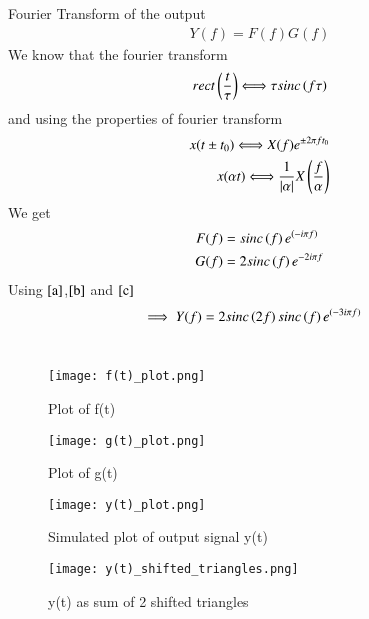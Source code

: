 \documentclass[journal,12pt,twocolumn]{IEEEtran}
\begin{document}
Fourier Transform of the output
\begin{align}
    Y(f)=F(f)G(f)  \label{a}
\end{align}
We know that the fourier transform
\begin{align}
    rect\left(\frac{t}{\tau}\right)\Longleftrightarrow \tau sinc\left({f \tau}\right)
\end{align}
and using the properties of fourier transform
\begin{align}
    x(t\pm t_0)\Longleftrightarrow X(f)e^{\pm 2\pi f t_0}\\
    x(\alpha t)\Longleftrightarrow \frac{1}{|\alpha|}X\left(\frac{f}{\alpha}\right)
\end{align}
We get
\begin{align}
    F(f) &= sinc\left(f\right)e^{\left(-i\pi f \right)} \label{b}\\ 
    G(f) &= 2sinc\left(f\right)e^{-2i\pi f} \label{c}
\end{align}
Using $\eqref{a}$,$\eqref{b}$ and $\eqref{c}$
\begin{align}
    \implies Y(f) &= 2sinc\left(2f\right)sinc\left(f\right)e^{\left(- 3i\pi f\right)}
\end{align}\\
\begin{figure}[!ht]
    \centering
    \texttt{[image: f(t)\_plot.png]}
    \caption{Plot of f(t)}
    \label{plot}
\end{figure}
\begin{figure}[!ht]
    \centering
    \texttt{[image: g(t)\_plot.png]}
    \caption{Plot of g(t)}
    \label{plot}
\end{figure}
\begin{figure}[!ht]
    \centering
    \texttt{[image: y(t)\_plot.png]}
    \caption{Simulated plot of output signal y(t)}
    \label{plot}
\end{figure}
\begin{figure}[!ht]
    \centering
    \texttt{[image: y(t)\_shifted\_triangles.png]}
    \caption{y(t) as sum of 2 shifted triangles}
    \label{plot}
\end{figure}
\end{document}
